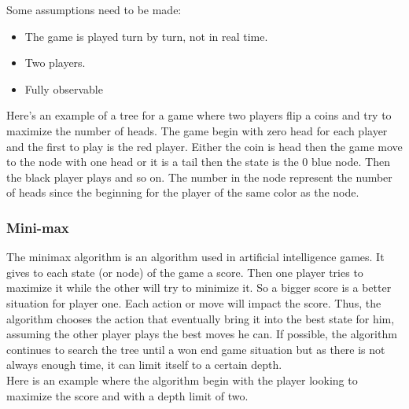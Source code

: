 Some assumptions need to be made: 
\begin{itemize}
\item The game is played turn by turn, not in real time. 
\item Two players.
\item Fully observable

\end{itemize}

Here's an example of a tree for a game where two players flip a coins and try to maximize the number of heads. The game begin with zero head for each player and the first to play is the red player. Either the coin is head then the game move to the node with one head or it is a tail then the state is the 0 blue node. Then the black player plays and so on. The number in the node represent the number of heads since the beginning for the player of the same color as the node. 

\begin{center}
\end{center}

\subsubsection{Mini-max}

The minimax algorithm is an algorithm used in artificial intelligence games. It gives to each state (or node) of the game a score. Then one player tries to maximize it while the other will try to minimize it. So a bigger score is a better situation for player one. Each action or move will impact the score. Thus, the algorithm chooses the action that eventually bring it into the best state for him, assuming the other player plays the best moves he can. If possible, the algorithm continues to search the tree until a won end game situation but as there is not always enough time, it can limit itself to a certain depth. 
\\

Here is an example where the algorithm begin with the player looking to maximize the score and with a depth limit of two. 

